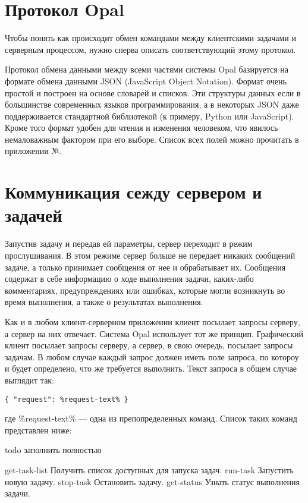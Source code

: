 \section{Протокол Opal}

Чтобы понять как происходит обмен командами между клиентскими задачами и серверным процессом, нужно сперва описать соответствующий этому протокол.

Протокол обмена данными между всеми частями системы Opal базируется на формате обмена данными JSON (JavaScript Object Notation). Формат очень простой и построен на основе словарей и списков. Эти структуры данных если в большинстве современных языков программирования, а в некоторых JSON даже поддерживается стандартной библиотекой (к примеру, Python или JavaScript). Кроме того формат удобен для чтения и изменения человеком, что явилось немаловажным фактором при его выборе. Список всех полей можно прочитать в приложении №.

\section{Коммуникация сежду сервером и задачей}

Запустив задачу и передав ей параметры, сервер переходит в режим прослушивания. В этом режиме сервер больше не передает никаких сообщений задаче, а только принимает сообщения от нее и обрабатывает их. Сообщения содержат в себе информацию о ходе выполнения задачи, каких-либо комментариях, предупреждениях или ошибках, которые могли возникнуть во время выполнения, а также о результатах выполнения.

Как и в любом клиент-серверном приложении клиент посылает запросы серверу, а сервер на них отвечает. Система Opal использует тот же принцип. Графический клиент посылает запросы серверу, а сервер, в свою очередь, посылает запросы задачам. В любом случае каждый запрос должен иметь поле запроса, по котороу и будет определено, что же требуется выполнить. Текст запроса в общем случае выглядит так:
\begin{verbatim}
{ "request": %request-text% }
\end{verbatim}
где \%request-text\% — одна из препопределенных команд. Список таких команд представлен ниже:

todo заполнить полностью

get-task-list
	Получить список доступных для запуска задач.
	run-task
	Запустить новую задачу.
	stop-task
	Остановить задачу.
	get-status
	Узнать статус выполнения задачи.
	
